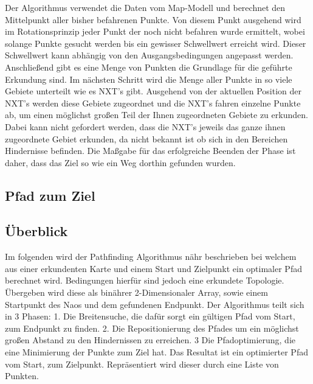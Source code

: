 
Der Algorithmus verwendet die Daten vom Map-Modell und berechnet den Mittelpunkt aller bisher befahrenen Punkte. Von diesem Punkt ausgehend wird im Rotationsprinzip jeder Punkt der noch nicht befahren wurde ermittelt, wobei solange Punkte gesucht werden bis ein gewisser Schwellwert erreicht wird. Dieser Schwellwert kann abhängig von den Ausgangsbedingungen angepasst werden. Anschließend gibt es eine Menge von Punkten die Grundlage für die geführte Erkundung sind. Im nächsten Schritt wird die Menge aller Punkte in so viele Gebiete unterteilt wie es NXT's gibt. Ausgehend von der aktuellen Position der NXT's werden diese Gebiete zugeordnet und die NXT's fahren einzelne Punkte ab, um einen möglichst großen Teil der Ihnen zugeordneten Gebiete zu erkunden. Dabei kann nicht gefordert werden, dass die NXT's jeweils das ganze ihnen zugeordnete Gebiet erkunden, da nicht bekannt ist ob sich in den Bereichen Hindernisse befinden. Die Maßgabe für das erfolgreiche Beenden der Phase ist daher, dass das Ziel so wie ein Weg dorthin gefunden wurden. 

\subsection{Pfad zum Ziel}
\subsection*{Überblick}
	Im folgenden wird der Pathfinding Algorithmus nähr beschrieben bei welchem aus einer erkundenten Karte und einem Start und Zielpunkt ein optimaler Pfad berechnet wird. Bedingungen hierfür sind jedoch eine erkundete Topologie. Übergeben wird diese als binährer 2-Dimensionaler Array, sowie einem Startpunkt des Naos und dem gefundenen Endpunkt. Der Algorithmus teilt sich in 3 Phasen: 1. Die Breitensuche, die dafür sorgt ein gültigen Pfad vom Start, zum Endpunkt zu finden. 2. Die Repositionierung des Pfades um ein möglichst großen Abstand zu den Hindernissen zu erreichen. 3 Die Pfadoptimierung, die eine Minimierung der Punkte zum Ziel hat. Das Resultat ist ein optimierter Pfad vom Start, zum Zielpunkt. Repräsentiert wird dieser durch eine Liste von Punkten.

